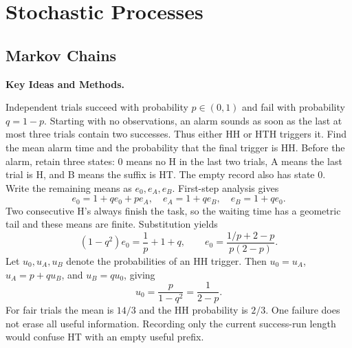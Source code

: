 \chapter{Stochastic Processes}
\section{Markov Chains}
\noindent\textbf{Key Ideas and Methods.}\enspace



Independent trials succeed with probability $p\in(0,1)$ and fail with probability $q=1-p$. Starting with no observations, an alarm sounds as soon as the last at most three trials contain two successes. Thus either HH or HTH triggers it. Find the mean alarm time and the probability that the final trigger is HH.
\solution Before the alarm, retain three states: 0 means no H in the last two trials, A means the last trial is H, and B means the suffix is HT. The empty record also has state 0. Write the remaining means as $e_0,e_A,e_B$. First-step analysis gives
\[
 e_0=1+qe_0+pe_A,\quad e_A=1+qe_B,\quad e_B=1+qe_0.
\]
Two consecutive H's always finish the task, so the waiting time has a geometric tail and these means are finite. Substitution yields
\[
 (1-q^2)e_0=\frac1p+1+q,\qquad
 \boxed{e_0=\frac{1/p+2-p}{p(2-p)}}.
\]
Let $u_0,u_A,u_B$ denote the probabilities of an HH trigger. Then $u_0=u_A$, $u_A=p+qu_B$, and $u_B=qu_0$, giving
\[
 \boxed{u_0=\frac{p}{1-q^2}=\frac1{2-p}}.
\]
For fair trials the mean is $14/3$ and the HH probability is $2/3$.
\insight One failure does not erase all useful information. Recording only the current success-run length would confuse HT with an empty useful prefix.



